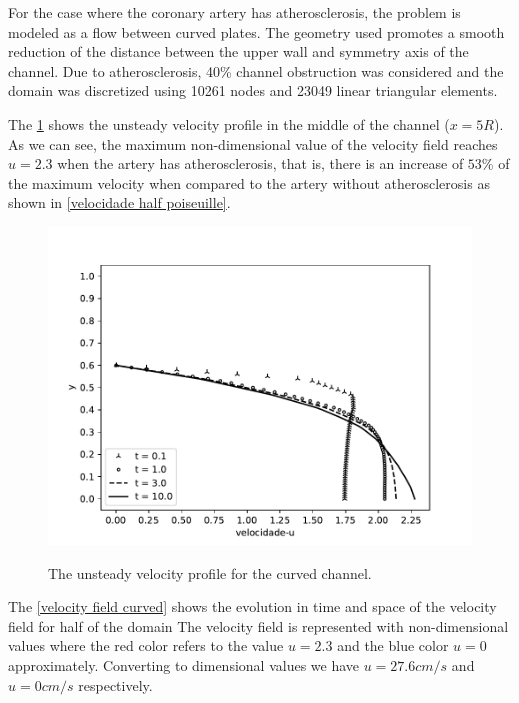 For the case where the coronary artery has atherosclerosis, 
the problem is modeled as a flow between curved plates. 
The geometry used promotes a smooth reduction of the 
distance between the upper wall and symmetry axis of the channel. 
Due to atherosclerosis, 40\% channel obstruction was considered 
and the domain was discretized using 10261 nodes and 23049 
linear triangular elements. 

\par 
The \ref{velocity evolution curved} shows the unsteady velocity 
profile in the middle of the channel ($x=5R$). 
As we can see, the maximum non-dimensional value of the velocity field 
reaches $ u=2.3$ when the artery has atherosclerosis, that is, 
there is an increase of $53$\% of the maximum velocity when 
compared to the artery without atherosclerosis as shown in 
\ref{velocidade half poiseuille}.



\begin{figure}[H]
     \centering
     \includegraphics[scale=1]{./02_chaps/cap_solution/figure/vel_Curved_evol.pdf}\\
     \caption{The unsteady velocity profile for the curved channel.}
     \label{velocity evolution curved}
\end{figure}

\newpage
The \ref{velocity field curved} shows the evolution in time and space 
of the velocity field for half of the domain
The velocity field is represented with non-dimensional values 
where the red color refers to the value $u=2.3$ and 
the blue color $u=0$ approximately. Converting to dimensional values 
we have $u=27.6cm/s$ and $u=0cm/s$ respectively.

